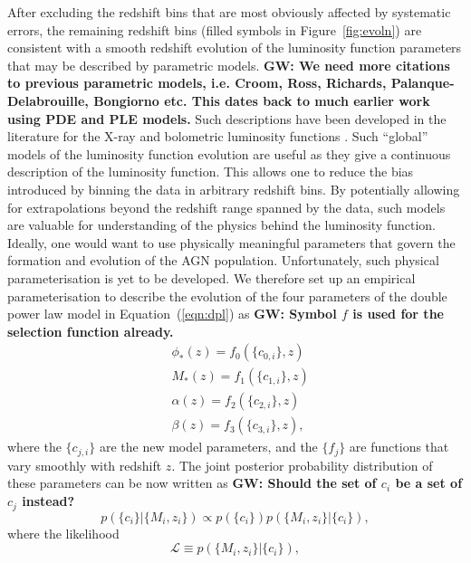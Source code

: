 \documentclass[fleqn,usenatbib]{mnras}
\begin{document}
After excluding the redshift bins that are most obviously affected by systematic errors,
the remaining redshift bins (filled symbols in Figure~\ref{fig:evoln}) are consistent with a
smooth redshift evolution of the luminosity function parameters that may be
described by parametric models. 
\textbf{GW: We need more citations to previous parametric models, i.e. Croom, Ross, Richards, Palanque-Delabrouille, Bongiorno etc. This dates back to much earlier work using PDE and PLE models.}
Such descriptions have been developed in the
literature for the X-ray \citep[e.g.,][]{2015MNRAS.451.1892A} and
bolometric luminosity functions \citep[e.g.,][]{2007ApJ...654..731H}.
Such ``global'' models of the luminosity function evolution are useful
as they give a continuous description of the luminosity function.
This allows one to reduce the bias introduced by binning the data in
arbitrary redshift bins.  By potentially allowing for extrapolations
beyond the redshift range spanned by the data, such models are
valuable for understanding of the physics behind the luminosity
function.  Ideally, one would want to use physically meaningful
parameters that govern the formation and evolution of the AGN
population.  Unfortunately, such physical parameterisation is yet to
be developed.  We therefore set up an empirical parameterisation to
describe the evolution of the four parameters of the double power law
model in Equation~(\ref{eqn:dpl}) as
\textbf{GW: Symbol $f$ is used for the selection function already.}
\begin{align}
  &\phi_*(z) = f_0(\{c_{0,i}\}, z)\nonumber\\
  &M_*(z) = f_1(\{c_{1,i}\}, z)\nonumber\\
  &\alpha(z) = f_2(\{c_{2,i}\}, z)\nonumber\\
  &\beta(z) = f_3(\{c_{3,i}\}, z),
  \label{eqn:global}
\end{align}
where the $\{c_{j,i}\}$ are the new model parameters, and the $\{f_j\}$
are functions that vary smoothly with redshift $z$.  The joint
posterior probability distribution of these parameters can be now
written as
\textbf{GW: Should the set of $c_i$ be a set of $c_j$ instead?}
\begin{equation}
  p(\{c_i\} | \{M_i, z_i\}) \propto p(\{c_i\})p(\{M_i, z_i\} | \{c_i\}),
\end{equation}
where the likelihood 
\begin{equation}
  \mathcal{L}\equiv p(\{M_i, z_i\} | \{c_i\}),
\end{equation}
\end{document}
